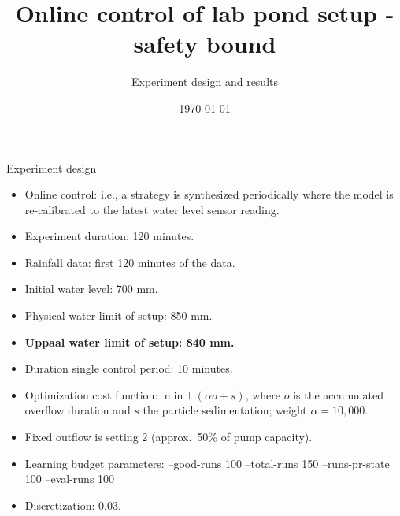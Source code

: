 \documentclass[notheorems,aspectratio=169]{beamer}
\title{Online control of lab pond setup - safety bound}
\subtitle{Experiment design and results}
\date{\today}
\begin{document}
%
\begin{frame}
	\titlepage
\end{frame}
%

\begin{frame}{Experiment design}
	\small
	\begin{itemize}
		\item Online control: i.e., a strategy is synthesized periodically where the model is re-calibrated to the latest water level sensor reading.
		\item Experiment duration: 120 minutes.
		\item Rainfall data: first 120 minutes of the data.
		\item Initial water level: 700 mm.
		\item Physical water limit of setup: 850 mm.
		\item \textbf{Uppaal water limit of setup: 840 mm.}
		\item Duration single control period: 10 minutes.
		\item Optimization cost function: $\min\  \mathbb{E}(\alpha o + s)$, where $o$ is the accumulated overflow duration and $s$ the particle sedimentation; weight $\alpha = 10,000$.
		\item Fixed outflow is setting 2 (approx.\ 50\% of pump capacity).
		\item Learning budget parameters: --good-runs 100 --total-runs 150 --runs-pr-state 100 --eval-runs 100 
		\item Discretization: 0.03.
	\end{itemize}
\end{frame}
	
\end{document}
